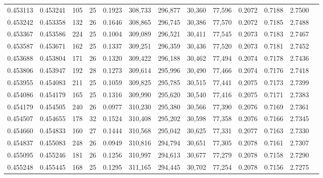 \begin{tabular}{rrrrrrrrrrrrr}
0.453113 & 0.453241 &   105 &  25 &                                     0.1923 & 308,733 & 296,877 &  30,360 &  77,596 & 0.2072 & 0.7188 & 2.7500 \\
0.453242 & 0.453358 &   132 &  26 &                                     0.1646 & 308,865 & 296,745 &  30,386 &  77,570 & 0.2072 & 0.7185 & 2.7488 \\
0.453367 & 0.453586 &   224 &  25 &                                     0.1004 & 309,089 & 296,521 &  30,411 &  77,545 & 0.2073 & 0.7183 & 2.7467 \\
0.453587 & 0.453671 &   162 &  25 &                                     0.1337 & 309,251 & 296,359 &  30,436 &  77,520 & 0.2073 & 0.7181 & 2.7452 \\
0.453688 & 0.453804 &   171 &  26 &                                     0.1320 & 309,422 & 296,188 &  30,462 &  77,494 & 0.2074 & 0.7178 & 2.7436 \\
0.453806 & 0.453947 &   192 &  28 &                                     0.1273 & 309,614 & 295,996 &  30,490 &  77,466 & 0.2074 & 0.7176 & 2.7418 \\
0.453955 & 0.454083 &   211 &  25 &                                     0.1059 & 309,825 & 295,785 &  30,515 &  77,441 & 0.2075 & 0.7173 & 2.7399 \\
0.454086 & 0.454179 &   165 &  25 &                                     0.1316 & 309,990 & 295,620 &  30,540 &  77,416 & 0.2075 & 0.7171 & 2.7383 \\
0.454179 & 0.454505 &   240 &  26 &                                     0.0977 & 310,230 & 295,380 &  30,566 &  77,390 & 0.2076 & 0.7169 & 2.7361 \\
0.454507 & 0.454655 &   178 &  32 &                                     0.1524 & 310,408 & 295,202 &  30,598 &  77,358 & 0.2076 & 0.7166 & 2.7345 \\
0.454660 & 0.454833 &   160 &  27 &                                     0.1444 & 310,568 & 295,042 &  30,625 &  77,331 & 0.2077 & 0.7163 & 2.7330 \\
0.454837 & 0.455083 &   248 &  26 &                                     0.0949 & 310,816 & 294,794 &  30,651 &  77,305 & 0.2078 & 0.7161 & 2.7307 \\
0.455095 & 0.455246 &   181 &  26 &                                     0.1256 & 310,997 & 294,613 &  30,677 &  77,279 & 0.2078 & 0.7158 & 2.7290 \\
0.455248 & 0.455445 &   168 &  25 &                                     0.1295 & 311,165 & 294,445 &  30,702 &  77,254 & 0.2078 & 0.7156 & 2.7275 \\

\end{tabular}
